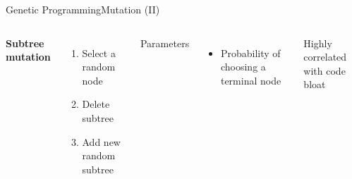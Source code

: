 \documentclass[10pt,compress]{beamer} %
\begin{document}
\begin{frame}{Genetic Programming}{Mutation (II)} 
    \begin{columns}
	\textbf{Subtree mutation}
	\begin{enumerate}
		\item Select a random node
		\item Delete subtree
		\item Add new random subtree
	\end{enumerate}

	Parameters
	\begin{itemize}
		\item Probability of choosing a terminal node
	\end{itemize}

	Highly correlated with \alert{code bloat}
	\end{columns}

	\bigskip


\end{frame}
\end{document}
